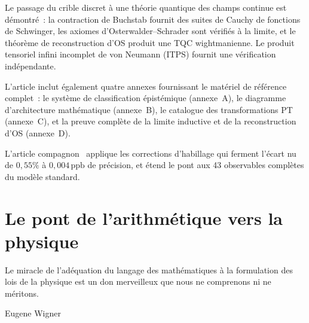 \documentclass[12pt,a4paper]{article}
\begin{document}
Le passage du crible discret à une théorie quantique des champs
continue est démontré~: la contraction de Buchstab fournit des
suites de Cauchy de fonctions de Schwinger, les axiomes
d'Osterwalder--Schrader sont vérifiés à la limite, et le théorème
de reconstruction d'OS produit une TQC wightmanienne. Le produit
tensoriel infini incomplet de von Neumann (ITPS) fournit une
vérification indépendante.

L'article inclut également quatre annexes fournissant le matériel
de référence complet~: le système de classification épistémique
(annexe~A), le diagramme d'architecture mathématique (annexe~B),
le catalogue des transformations PT (annexe~C), et la preuve
complète de la limite inductive et de la reconstruction d'OS
(annexe~D).

L'article compagnon~\cite{companion_physics} applique les
corrections d'habillage qui ferment l'écart nu de $0{,}55\%$ à
$0{,}004\,\mathrm{ppb}$ de précision, et étend le pont aux 43
observables complètes du modèle standard.

\section{Le pont de l'arithmétique vers la physique}
\label{sec:bridge}

\epigraph{Le miracle de l'adéquation du langage des mathématiques
à la formulation des lois de la physique est un don merveilleux que
nous ne comprenons ni ne méritons.}{Eugene Wigner}
\end{document}
